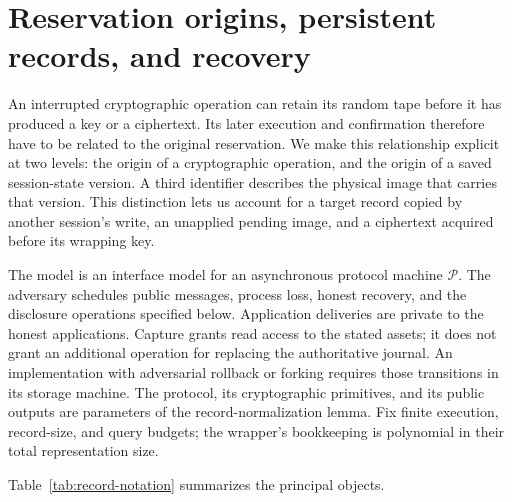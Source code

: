 
\section{Reservation origins, persistent records, and recovery}
\label{sec:security-model}

An interrupted cryptographic operation can retain its random tape before it
has produced a key or a ciphertext.  Its later execution and confirmation
therefore have to be related to the original reservation.  We make this
relationship explicit at two levels: the origin of a cryptographic operation,
and the origin of a saved session-state version.  A third identifier describes
the physical image that carries that version.  This distinction lets us
account for a target record copied by another session's write, an unapplied
pending image, and a ciphertext acquired before its wrapping key.

The model is an interface model for an asynchronous protocol machine
$\mathcal P$.  The adversary schedules public messages, process loss, honest
recovery, and the disclosure operations specified below.  Application
deliveries are private to the honest applications.  Capture grants read access
to the stated assets; it does not grant an additional operation for replacing
the authoritative journal.  An implementation with adversarial rollback or
forking requires those transitions in its storage machine.  The protocol,
its cryptographic primitives, and its public outputs are parameters of the
record-normalization lemma.  Fix finite execution, record-size, and query
budgets; the wrapper's bookkeeping is polynomial in their total
representation size.

Table~\ref{tab:record-notation} summarizes the principal objects.

